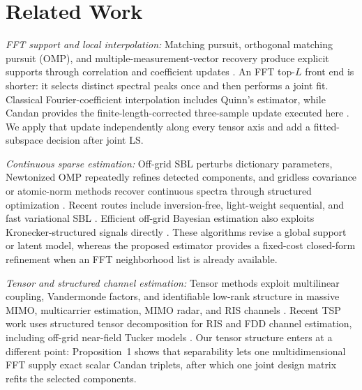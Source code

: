 \section{Related Work}

\emph{FFT support and local interpolation:} Matching pursuit, orthogonal matching pursuit (OMP), and multiple-measurement-vector recovery produce explicit supports through correlation and coefficient updates \cite{mallat1993matching,pati1993omp,tropp2007omp,cotter2005mmv}. An FFT top-$L$ front end is shorter: it selects distinct spectral peaks once and then performs a joint fit. Classical Fourier-coefficient interpolation includes Quinn's estimator, while Candan provides the finite-length-corrected three-sample update executed here \cite{quinn1994fourier_interpolation,candan2011three_dft}. We apply that update independently along every tensor axis and add a fitted-subspace decision after joint LS.

\emph{Continuous sparse estimation:} Off-grid SBL perturbs dictionary parameters, Newtonized OMP repeatedly refines detected components, and gridless covariance or atomic-norm methods recover continuous spectra through structured optimization \cite{yang2013ogsbi,mamandipoor2016nomp,stoica2011spice,wagner2021gridless_nua,wu2023gridless_multifrequency,pote2023ml_gridless,wu2024nonuniform_gridless,wu2024coffee}. Recent routes include inversion-free, light-weight sequential, and fast variational SBL \cite{song2024inversion_free_sbl,pote2025lws_sbl,moderl2025fast_bsbl}. Efficient off-grid Bayesian estimation also exploits Kronecker-structured signals directly \cite{he2025offgrid_kronecker}. These algorithms revise a global support or latent model, whereas the proposed estimator provides a fixed-cost closed-form refinement when an FFT neighborhood list is already available.

\emph{Tensor and structured channel estimation:} Tensor methods exploit multilinear coupling, Vandermonde factors, and identifiable low-rank structure in massive MIMO, multicarrier estimation, MIMO radar, and RIS channels \cite{qian2018tensor_dual_polarized,kofidis2020tensor_multicarrier,xu2022tensor_mimo_radar,gong2023esprit_tensor_train,du2023ris_tensor_phase_noise,wang2024irs_nlos_ofdm}. Recent TSP work uses structured tensor decomposition for RIS and FDD channel estimation, including off-grid near-field Tucker models \cite{dealmeida2025bdris_tensor,chen2025structured_tensor_fdd,cao2026offgrid_tucker}. Our tensor structure enters at a different point: Proposition~1 shows that separability lets one multidimensional FFT supply exact scalar Candan triplets, after which one joint design matrix refits the selected components.

